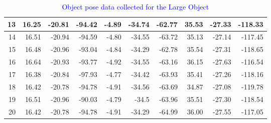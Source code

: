 \begin{table}[]
{\begin{tabular}{|r|r|r|r|r|r|r|r|r|r|}
13                            & 16.25                       & -20.81                      & -94.42                                 & -4.89                       & -34.74                      & -62.77                                 & 35.53                       & -27.33                      & -118.33                                \\ \hline
14                            & 16.51                       & -20.94                      & -94.59                                 & -4.80                        & -34.55                      & -63.72                                 & 35.13                       & -27.14                      & -117.45                                \\ \hline
15                            & 16.48                       & -20.96                      & -93.04                                 & -4.84                       & -34.29                      & -62.78                                 & 35.54                       & -27.31                      & -118.65                                \\ \hline
16                            & 16.64                       & -20.93                      & -93.77                                 & -4.92                       & -34.55                      & -63.16                                 & 36.15                       & -27.63                      & -116.54                                \\ \hline
17                            & 16.38                       & -20.84                      & -97.93                                 & -4.77                       & -34.42                      & -63.93                                 & 35.41                       & -27.26                      & -118.16                                \\ \hline
18                            & 16.42                       & -20.78                      & -94.78                                 & -4.91                       & -34.56                      & -63.69                                 & 34.87                       & -27.08                      & -119.78                                \\ \hline
19                            & 16.51                       & -20.96                      & -90.03                                 & -4.79                       & -34.5                       & -63.96                                 & 35.51                       & -27.30                       & -118.54                                \\ \hline
20                            & 16.42                       & -20.78                      & -94.78                                 & -4.91                       & -34.29                      & -64.99                                 & 36.00                          & -27.55                      & -117.05                                \\ \hline
\end{tabular}%
}
\caption{\textcolor{blue}{Object pose data collected for the Large Object}}
\label{tab:large-object}
\end{table}

